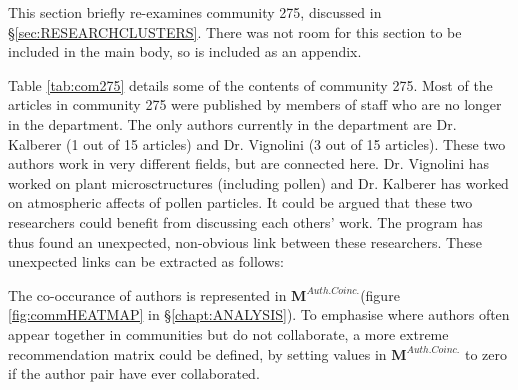 \label{sec:neonicotinoids}
This section briefly re-examines community 275, discussed in \S\ref{sec:RESEARCHCLUSTERS}. There was not room for this section to be included in the main body, so is included as an appendix. 

Table \ref{tab:com275} details some of the contents of community 275. Most of the articles in community 275 were published by members of staff who are no longer in the department. The only authors currently in the department are Dr. Kalberer (1 out of 15 articles) and Dr. Vignolini (3 out of 15 articles). These two authors work in very different fields, but are connected here. Dr. Vignolini has worked on plant microsctructures (including pollen) and Dr. Kalberer has worked on atmospheric affects of pollen particles. It could be argued that these two researchers could benefit from discussing each others' work. The program has thus found an unexpected, non-obvious link between these researchers. These unexpected links can be extracted as follows:

The co-occurance of authors is represented in $\mathbf{M}^{Auth. Coinc.}$(figure \ref{fig:commHEATMAP} in \S\ref{chapt:ANALYSIS}). To emphasise where authors often appear together in communities but do not collaborate, a more extreme recommendation matrix could be defined, by setting values in $\mathbf{M}^{Auth. Coinc.}$ to zero if the author pair have ever collaborated. 

